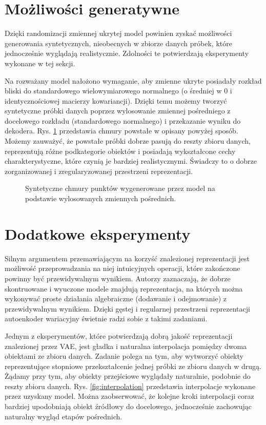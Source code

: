 \documentclass{iithesis}
\begin{document}
\section{Możliwości generatywne}
Dzięki randomizacji zmiennej ukrytej model powinien zyskać możliwości generowania syntetycznych,
nieobecnych w zbiorze danych próbek, które jednocześnie wyglądają realistycznie.
Zdolności te potwierdzają eksperymenty wykonane w tej sekcji.

Na rozważany model nałożono wymaganie, aby zmienne ukryte posiadały rozkład
bliski do standardowego wielowymiarowego normalnego (o średniej w 0 i identycznościowej macierzy
kowariancji). Dzięki temu możemy tworzyć syntetyczne próbki danych poprzez wylosowanie zmiennej
pośredniego z docelowego rozkładu (standardowego normalnego) i przekazanie wyniku do dekodera.
Rys. \ref{fig:random_generated} przedstawia chmury powstałe w opisany powyżej sposób.
Możemy zauważyć, że powstałe próbki dobrze pasują do reszty zbioru danych, reprezentują
różne podkategorie obiektów i posiadają wykształcone cechy charakterystyczne,
które czynią je bardziej realistycznymi. Świadczy to o dobrze zorganizowanej i zregularyzowanej
przestrzeni reprezentacji.

\begin{figure}
    \caption{\label{fig:random_generated} Syntetyczne chmury punktów wygenerowane
    przez model na podstawie wylosowanych zmiennych pośrednich. }
\end{figure}

\section{Dodatkowe eksperymenty}
Silnym argumentem przemawiającym na korzyść znalezionej reprezentacji jest możliwość przeprowadzania
na niej intuicyjnych operacji, które zakończone powinny być przewidywalnym wynikiem.
Autorzy \cite{algebra_reasons} zaznaczają, że dobrze skontruowane i wyuczone modele znajdują
reprezentacja, na których można wykonywać proste działania algebraiczne (dodawanie i odejmowanie) z
przewidywalnym wynikiem. Dzięki gęstej i regularnej przestrzeni reprezentacji autoenkoder
wariacyjny świetnie radzi sobie z takimi zadaniami.

Jednym z eksperymentów, które potwierdzają dobrą jakość reprezentacji znalezionej przez VAE,
jest gładka i naturalna interpolacja pomiędzy dwoma obiektami ze zbioru danych.
Zadanie polega na tym, aby wytworzyć obiekty reprezentujące stopniowe przekształcenie
jednej próbki ze zbioru danych w drugą. Żądamy przy tym, aby obiekty przejściowe wyglądały naturalnie,
podobnie do reszty zbioru danych. Rys. \ref{fig:interpolation} przedstawia interpolacje wykonane przez uzyskany model.
Można zaobserwować, że kolejne kroki interpolacji coraz bardziej upodobniają obiekt
źródłowy do docelowego, jednocześnie zachowując naturalny wygląd etapów pośrednich.
\end{document}
